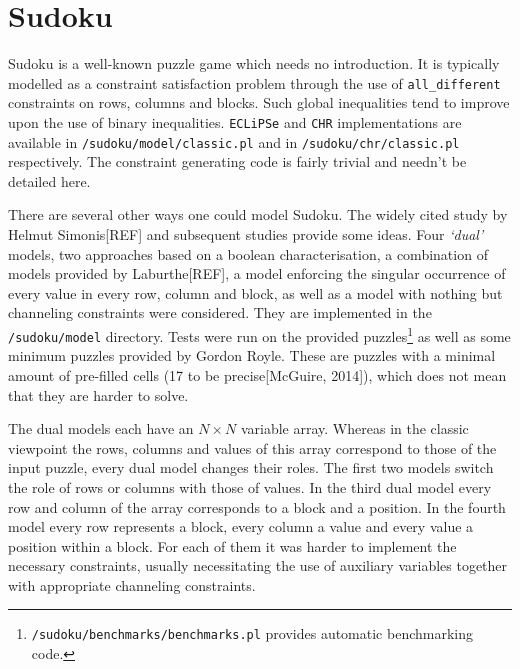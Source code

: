 \section{Sudoku}

Sudoku is a well-known puzzle game which needs no introduction. It is typically modelled as a constraint satisfaction problem through the use of \texttt{all\_different} constraints on rows, columns and blocks. Such global inequalities tend to improve upon the use of binary inequalities. \texttt{ECLiPSe} and \texttt{CHR} implementations are available in \texttt{/sudoku/model/classic.pl} and in \texttt{/sudoku/chr/classic.pl} respectively. The constraint generating code is fairly trivial and needn't be detailed here. \\\par

There are several other ways one could model Sudoku. The widely cited study by Helmut Simonis[REF] and subsequent studies provide some ideas. Four \textit{`dual'} models, two approaches based on a boolean characterisation, a combination of models provided by Laburthe[REF], a model enforcing the singular occurrence of every value in every row, column and block, as well as a model with nothing but channeling constraints were considered. They are implemented in the \texttt{/sudoku/model} directory. Tests were run on the provided puzzles\footnote{\texttt{/sudoku/benchmarks/benchmarks.pl} provides automatic benchmarking code.} as well as some minimum puzzles provided by Gordon Royle. These are puzzles with a minimal amount of pre-filled cells (17 to be precise[McGuire, 2014]), which does not mean that they are harder to solve. \\\par

The dual models each have an $N\times N$ variable array. Whereas in the classic viewpoint the rows, columns and values of this array correspond to those of the input puzzle, every dual model changes their roles. The first two models switch the role of rows or columns with those of values. In the third dual model every row and column of the array corresponds to a block and a position. In the fourth model every row represents a block, every column a value and every value a position within a block. For each of them it was harder to implement the necessary constraints, usually necessitating the use of auxiliary variables together with appropriate channeling constraints.\\\par  

